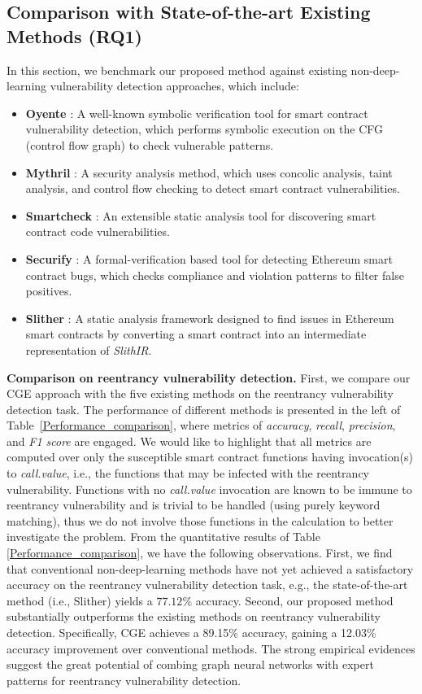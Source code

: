 \subsection{Comparison with  State-of-the-art Existing Methods (RQ1)}
\label{comparisons}
In this section, we benchmark our proposed method against existing non-deep-learning vulnerability detection approaches, which include:
\begin{itemize}[noitemsep,wide=0pt, leftmargin=\dimexpr{} + 2\relax]
	\item \textbf{Oyente} \cite{oyente}: A well-known symbolic verification tool for smart contract vulnerability detection, which performs symbolic execution on the CFG (control flow graph) to check vulnerable patterns.
	\item \textbf{Mythril} \cite{mythril}: A security analysis method, which uses concolic analysis, taint analysis, and control flow checking to detect smart contract vulnerabilities.
	\item \textbf{Smartcheck} \cite{smartcheck}: An extensible static analysis tool for discovering smart contract code vulnerabilities.
	\item \textbf{Securify} \cite{securify}: A formal-verification based tool for detecting Ethereum smart contract bugs, which checks compliance and violation patterns to filter false positives.
	\item \textbf{Slither} \cite{feist2019slither}: A static analysis framework designed to find issues in Ethereum smart contracts by converting a smart contract into an intermediate representation of \emph{SlithIR}.
\end{itemize}

\textbf{Comparison on reentrancy vulnerability detection.} First, we compare our CGE approach with the five existing methods on the reentrancy vulnerability detection task. The performance of different methods is presented in the left of Table~\ref{Performance_comparison}, where metrics of \emph{accuracy}, \emph{recall}, \emph{precision}, and \emph{F1 score} are engaged. We would like to highlight that all metrics are computed over only the susceptible smart contract functions having invocation(s) to \emph{call.value}, i.e., the functions that may be infected with the reentrancy vulnerability. Functions with no \emph{call.value} invocation are known to be immune to reentrancy vulnerability and is trivial to be handled (using purely keyword matching), thus we do not involve those functions in the calculation to better investigate the problem. From the quantitative results of Table \ref{Performance_comparison}, we have the following observations. First, we find that conventional non-deep-learning methods have not yet achieved a satisfactory accuracy on the reentrancy vulnerability detection task, e.g., the state-of-the-art method (i.e., Slither) yields a $77.12\%$ accuracy. Second, our proposed method substantially outperforms the existing methods on reentrancy vulnerability detection. Specifically, CGE achieves a 89.15\% accuracy, gaining a 12.03\% accuracy improvement over conventional methods. The strong empirical evidences suggest the great potential of combing graph neural networks with expert patterns for reentrancy vulnerability detection. 

